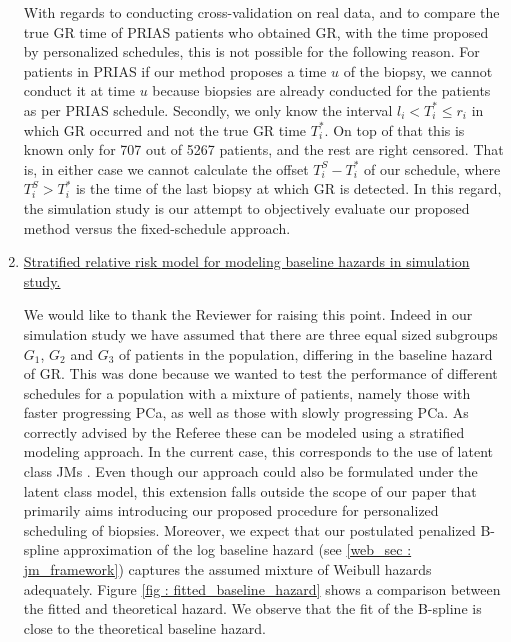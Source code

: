 \begin{enumerate}
	With regards to conducting cross-validation on real data, and to compare the true GR time of PRIAS patients who obtained GR, with the time proposed by personalized schedules, this is not possible for the following reason. For patients in PRIAS if our method proposes a time $u$ of the biopsy, we cannot conduct it at time $u$ because biopsies are already conducted for the patients as per PRIAS schedule. Secondly, we only know the interval $l_i < T^*_i \leq r_i$ in which GR occurred and not the true GR time $T^*_i$. On top of that this is known only for 707 out of 5267 patients, and the rest are right censored. That is, in either case we cannot calculate the offset $T^S_i - T^*_i$ of our schedule, where $T^S_i > T^*_i$ is the time of the last biopsy at which GR is detected. In this regard, the simulation study is our attempt to objectively evaluate our proposed method versus the fixed-schedule approach.

	\item \underline{Stratified relative risk model for modeling baseline hazards in simulation study.}

	We would like to thank the Reviewer for raising this point. Indeed in our simulation study we have assumed that there are three equal sized subgroups $G_1$, $G_2$ and $G_3$ of patients in the population, differing in the baseline hazard of GR. This was done because we wanted to test the performance of different schedules for a population with a mixture of patients, namely those with faster progressing PCa, as well as those with slowly progressing PCa. As correctly advised by the Referee these can be modeled using a stratified modeling approach. In the current case, this corresponds to the use of latent class JMs \citep{proust2014joint}. Even though our approach could also be formulated under the latent class model, this extension falls outside the scope of our paper that primarily aims introducing our proposed procedure for personalized scheduling of biopsies. Moreover, we expect that our postulated penalized B-spline approximation of the log baseline hazard (see \ref{web_sec : jm_framework}) captures the assumed mixture of Weibull hazards adequately. Figure \ref{fig : fitted_baseline_hazard} shows a comparison between the fitted and theoretical hazard. We observe that the fit of the B-spline is close to the theoretical baseline hazard.


\end{enumerate}
